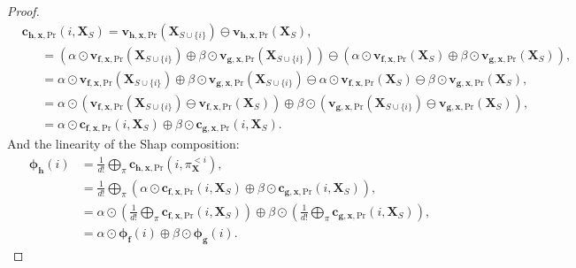 \documentclass{article}
\theoremstyle{plain}
\theoremstyle{definition}
\theoremstyle{remark}
\begin{document}
\begin{proof}
  \begin{equation}
    \begin{aligned}
      &\bm{c}_{\bm{h},\bm{x},\text{Pr}}(i,\bm{X}_S) = \bm{v}_{\bm{h},\bm{x},\text{Pr}}(\bm{X}_{S\cup\{i\}}) \ominus \bm{v}_{\bm{h},\bm{x},\text{Pr}}(\bm{X}_S),\\
      &~~~~~~~= \left( \alpha \odot \bm{v}_{\bm{f},\bm{x},\text{Pr}}(\bm{X}_{S\cup\{i\}}) \oplus \beta \odot \bm{v}_{\bm{g},\bm{x},\text{Pr}}(\bm{X}_{S\cup\{i\}}) \right) \ominus \left( \alpha \odot \bm{v}_{\bm{f},\bm{x},\text{Pr}}(\bm{X}_S) \oplus \beta \odot \bm{v}_{\bm{g},\bm{x},\text{Pr}}(\bm{X}_S) \right),\\
      &~~~~~~~= \alpha \odot \bm{v}_{\bm{f},\bm{x},\text{Pr}}(\bm{X}_{S\cup\{i\}}) \oplus \beta \odot \bm{v}_{\bm{g},\bm{x},\text{Pr}}(\bm{X}_{S\cup\{i\}}) \ominus\alpha \odot \bm{v}_{\bm{f},\bm{x},\text{Pr}}(\bm{X}_S) \ominus \beta \odot \bm{v}_{\bm{g},\bm{x},\text{Pr}}(\bm{X}_S),\\
      &~~~~~~~= \alpha \odot \left( \bm{v}_{\bm{f},\bm{x},\text{Pr}}(\bm{X}_{S\cup\{i\}}) \ominus \bm{v}_{\bm{f},\bm{x},\text{Pr}}(\bm{X}_S) \right) \oplus \beta \odot \left( \bm{v}_{\bm{g},\bm{x},\text{Pr}}(\bm{X}_{S\cup\{i\}}) \ominus \bm{v}_{\bm{g},\bm{x},\text{Pr}}(\bm{X}_S)\right),\\
      &~~~~~~~= \alpha \odot \bm{c}_{\bm{f},\bm{x},\text{Pr}}(i,\bm{X}_S) \oplus \beta \odot \bm{c}_{\bm{g},\bm{x},\text{Pr}}(i,\bm{X}_S).
    \end{aligned}
  \end{equation}
  And the linearity of the Shap composition:
  \begin{equation}
    \begin{aligned}
      \bm{\phi}_{\bm{h}}(i) &= \frac{1}{d!}  \underset{\pi}{\bigoplus}\bm{c}_{\bm{h},\bm{x},\text{Pr}}(i,\pi^{<i}_{\bm{X}}),\\
                            &= \frac{1}{d!}  \underset{\pi}{\bigoplus}\left( \alpha \odot \bm{c}_{\bm{f},\bm{x},\text{Pr}}(i,\bm{X}_S) \oplus \beta \odot \bm{c}_{\bm{g},\bm{x},\text{Pr}}(i,\bm{X}_S) \right),\\
                            &= \alpha \odot \left( \frac{1}{d!}  \underset{\pi}{\bigoplus} \bm{c}_{\bm{f},\bm{x},\text{Pr}}(i,\bm{X}_S) \right) \oplus \beta \odot \left( \frac{1}{d!} \underset{\pi}{\bigoplus}    \bm{c}_{\bm{g},\bm{x},\text{Pr}}(i,\bm{X}_S) \right),\\
                            &= \alpha \odot \bm{\phi}_{\bm{f}}(i) \oplus \beta\odot \bm{\phi}_{\bm{g}}(i).
    \end{aligned}
  \end{equation}
\end{proof}
\end{document}
